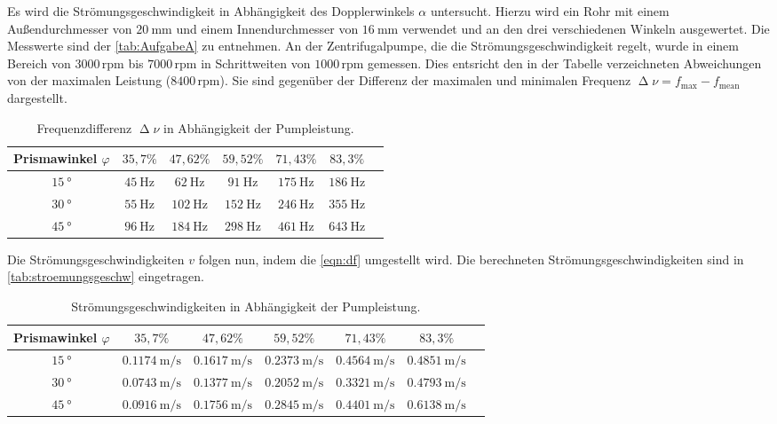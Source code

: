 \noindent
Es wird die Strömungsgeschwindigkeit in Abhängigkeit des Dopplerwinkels $\alpha$ untersucht. Hierzu wird ein Rohr mit einem Außendurchmesser von $\SI{20}{\milli\meter}$
und einem Innendurchmesser von $\SI{16}{\milli\meter}$ verwendet und an den drei verschiedenen Winkeln ausgewertet. Die Messwerte sind der \autoref{tab:AufgabeA} zu entnehmen.
An der Zentrifugalpumpe, die die Strömungsgeschwindigkeit regelt, wurde in einem Bereich von $3000 \,\text{rpm}$ bis $7000 \,\text{rpm}$ in Schrittweiten von $1000 \,\text{rpm}$ gemessen. Dies entsricht den in der
Tabelle verzeichneten Abweichungen von der maximalen Leistung ($8400\, \text{rpm}$). Sie sind gegenüber der Differenz der maximalen und minimalen Frequenz $\upDelta \nu = f_{\text{max}} - f_{\text{mean}}$ dargestellt.
\begin{table}[H]
  \centering
  \caption{Frequenzdifferenz $\upDelta \nu$ in Abhängigkeit der Pumpleistung.}
  \label{tab:AufgabeA}
  \begin{tabular}{c c c c c c c}
    \toprule
    Prismawinkel $\varphi$ & $35,7 \%$ & $47,62 \%$ & $59,52 \%$ & $71,43 \%$ & $83,3 \%$\\
    \midrule
    $\SI{15}{\degree}$ & $\SI{45}{\hertz}$ & $\SI{62}{\hertz}$ & $\SI{91}{\hertz}$ & $\SI{175}{\hertz}$ & $\SI{186}{\hertz}$ \\
    $\SI{30}{\degree}$ & $\SI{55}{\hertz}$ & $\SI{102}{\hertz}$ & $\SI{152}{\hertz}$ & $\SI{246}{\hertz}$ & $\SI{355}{\hertz}$ \\
    $\SI{45}{\degree}$ & $\SI{96}{\hertz}$ & $\SI{184}{\hertz}$ & $\SI{298}{\hertz}$ & $\SI{461}{\hertz}$ & $\SI{643}{\hertz}$ \\
    \bottomrule
  \end{tabular}
\end{table}

\noindent
Die Strömungsgeschwindigkeiten $v$ folgen nun, indem die \autoref{eqn:df} umgestellt wird. Die berechneten Strömungsgeschwindigkeiten sind in \autoref{tab:stroemungsgeschw} eingetragen.
\begin{table}[H]
  \centering
  \caption{Strömungsgeschwindigkeiten in Abhängigkeit der Pumpleistung.}
  \label{tab:stroemungsgeschw}
  \begin{tabular}{c c c c c c c}
    \toprule
    Prismawinkel $\varphi$ & $35,7 \%$ & $47,62 \%$ & $59,52 \%$ & $71,43 \%$ & $83,3 \%$\\
    \midrule
    $\SI{15}{\degree}$ & $\SI{0,1174}{\meter\per\second}$ & $\SI{0,1617}{\meter\per\second}$ & $\SI{0,2373}{\meter\per\second}$ & $\SI{0,4564}{\meter\per\second}$ & $\SI{0,4851}{\meter\per\second}$ \\
    $\SI{30}{\degree}$ & $\SI{0,0743}{\meter\per\second}$ & $\SI{0,1377}{\meter\per\second}$ & $\SI{0,2052}{\meter\per\second}$ & $\SI{0,3321}{\meter\per\second}$ & $\SI{0,4793}{\meter\per\second}$ \\
    $\SI{45}{\degree}$ & $\SI{0,0916}{\meter\per\second}$ & $\SI{0,1756}{\meter\per\second}$ & $\SI{0,2845}{\meter\per\second}$ & $\SI{0,4401}{\meter\per\second}$ & $\SI{0,6138}{\meter\per\second}$ \\
    \bottomrule
  \end{tabular}
\end{table}

